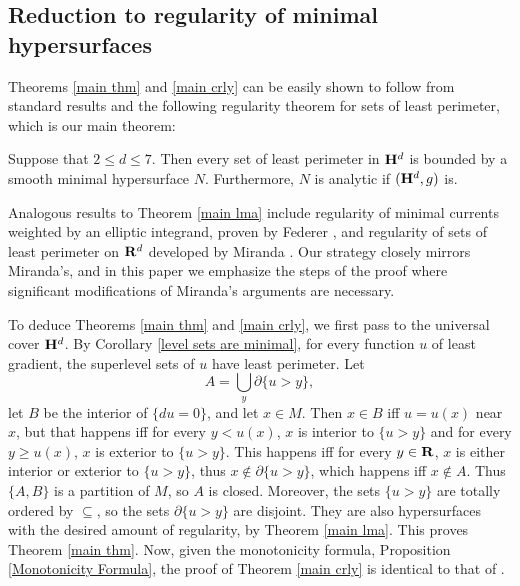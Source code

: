 
\subsection{Reduction to regularity of minimal hypersurfaces}

Theorems \ref{main thm} and \ref{main crly} can be easily shown to follow from standard results and the following regularity theorem for sets of least perimeter, which is our main theorem:

\begin{theorem}\label{main lma}
Suppose that $2 \leq d \leq 7$.
Then every set of least perimeter in $\mathbf H^d$ is bounded by a smooth minimal hypersurface $N$.
Furthermore, $N$ is analytic if $(\mathbf H^d, g)$ is.
\end{theorem}

Analogous results to Theorem \ref{main lma} include regularity of minimal currents weighted by an elliptic integrand, proven by Federer \cite[\S5.3]{federer2014geometric}, and regularity of sets of least perimeter on $\mathbf{R}^d$ developed by Miranda \cite{Miranda64} \cite{Miranda66} \cite{Miranda67}.
Our strategy closely mirrors Miranda's, and in this paper we emphasize the steps of the proof where significant modifications of Miranda's arguments are necessary.

To deduce Theorems \ref{main thm} and \ref{main crly}, we first pass to the universal cover $\mathbf H^d$.
By Corollary \ref{level sets are minimal}, for every function $u$ of least gradient, the superlevel sets of $u$ have least perimeter.
Let
\begin{equation}\label{lamination union}
A = \bigcup_y \partial \{u > y\},
\end{equation}
let $B$ be the interior of $\{du = 0\}$, and let $x \in M$.
Then $x \in B$ iff $u = u(x)$ near $x$, but that happens iff for every $y < u(x)$, $x$ is interior to $\{u > y\}$ and for every $y \geq u(x)$, $x$ is exterior to $\{u > y\}$.
This happens iff for every $y \in \mathbf{R}$, $x$ is either interior or exterior to $\{u > y\}$, thus $x \notin \partial \{u > y\}$, which happens iff $x \notin A$.
Thus $\{A, B\}$ is a partition of $M$, so $A$ is closed.
Moreover, the sets $\{u > y\}$ are totally ordered by $\subseteq$, so the sets $\partial \{u > y\}$ are disjoint.
They are also hypersurfaces with the desired amount of regularity, by Theorem \ref{main lma}.
This proves Theorem \ref{main thm}.
Now, given the monotonicity formula, Proposition \ref{Monotonicity Formula}, the proof of Theorem \ref{main crly} is identical to that of \cite[Proposition 3.4]{górny2017planar}.

